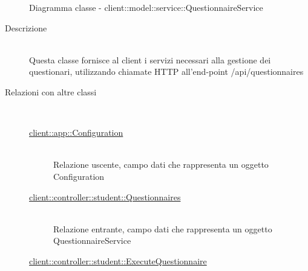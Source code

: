 \vspace{0.5cm}
\hypertarget{client::model::service::QuestionnaireService}{}
\begin{figure}[H]
	\centering
	\caption{Diagramma classe - client::model::service::QuestionnaireService}
\end{figure}\begin{description}
\item[Descrizione] \hfill \\
Questa classe fornisce al client i servizi necessari alla gestione dei questionari, utilizzando chiamate HTTP all'end-point /api/questionnaires
\item[Relazioni con altre classi] \hfill \\
\vspace{-7mm}
\begin{description}
	\item[\hyperlink{client::app::Configuration}{client::app::Configuration}] \hfill \\
	Relazione uscente, campo dati che rappresenta un oggetto Configuration
	\item[\hyperlink{client::controller::student::Questionnaires}{client::controller::student::Questionnaires}] \hfill \\
	Relazione entrante, campo dati che rappresenta un oggetto QuestionnaireService
	\item[\hyperlink{client::controller::student::ExecuteQuestionnaire}{client::controller::student::ExecuteQuestionnaire}] \hfill \\

\end{description}
\end{description}
